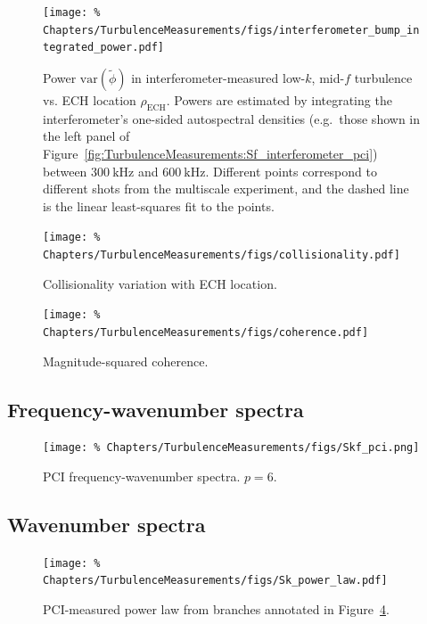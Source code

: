 \begin{figure}
  \centering
  \texttt{[image: \%
    Chapters/TurbulenceMeasurements/figs/interferometer\_bump\_integrated\_power.pdf]}
  \caption[Power in low-$k$, mid-$f$ turbulence vs. ECH location]{%
    Power $\text{var}(\tilde{\phi})$ in interferometer-measured
    low-$k$, mid-$f$ turbulence vs. ECH location $\rho_{\text{ECH}}$.
    Powers are estimated by integrating the interferometer's
    one-sided autospectral densities
    (e.g.\ those shown in the left panel of
    Figure~\ref{fig:TurbulenceMeasurements:Sf_interferometer_pci})
    between $\SI{300}{\kilo\hertz}$ and $\SI{600}{\kilo\hertz}$.
    Different points correspond to different shots
    from the multiscale experiment, and
    the dashed line is the linear least-squares fit to the points.
  }
\label{fig:TurbulenceMeasurements:interferometer_bump_integrated_power}
\end{figure}

\begin{figure}
  \centering
  \texttt{[image: \%
    Chapters/TurbulenceMeasurements/figs/collisionality.pdf]}
  \caption[Collisionality variation with ECH location]{%
    Collisionality variation with ECH location.
  }
\label{fig:TurbulenceMeasurements:collisionality}
\end{figure}

\begin{figure}
  \centering
  \texttt{[image: \%
    Chapters/TurbulenceMeasurements/figs/coherence.pdf]}
  \caption[Magnitude-squared coherence]{%
    Magnitude-squared coherence.
  }
  \label{fig:TurbulenceMeasurements:gamma2xy}
\end{figure}


\subsection{Frequency-wavenumber spectra}
\label{sec:TurbulenceMeasurements:Skf}

\begin{figure}
  \centering
  \texttt{[image: \%
    Chapters/TurbulenceMeasurements/figs/Skf\_pci.png]}
  \caption[PCI frequency-wavenumber spectra]{%
    PCI frequency-wavenumber spectra. $p = 6$.
  }
\label{fig:TurbulenceMeasurements:Skf_pci}
\end{figure}


\subsection{Wavenumber spectra}
\label{sec:TurbulenceMeasurements:Sk}
\begin{figure}
  \centering
  \texttt{[image: \%
    Chapters/TurbulenceMeasurements/figs/Sk\_power\_law.pdf]}
  \caption[PCI-measured power law]{%
    PCI-measured power law from branches annotated in
    Figure~\ref{fig:TurbulenceMeasurements:Skf_pci}.
  }
\label{fig:TurbulenceMeasurements:Sk_power_law}
\end{figure}


